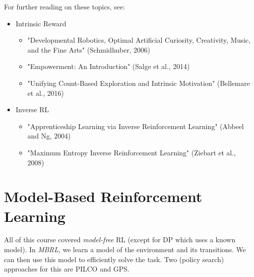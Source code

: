 		For further reading on these topics, see:
		\begin{itemize}
			\item Intrinsic Reward
				\begin{itemize}
					\item "Developmental Robotics, Optimal Artificial Curiosity, Creativity, Music, and the Fine Arts" (Schmidhuber, 2006)
					\item "Empowerment: An Introduction" (Salge et al., 2014)
					\item "Unifying Count-Based Exploration and Intrinsic Motivation" (Bellemare et al., 2016)
				\end{itemize}
			\item Inverse \ac{RL}
				\begin{itemize}
					\item "Apprenticeship Learning via Inverse Reinforcement Learning" (Abbeel and Ng, 2004)
					\item "Maximum Entropy Inverse Reinforcement Learning" (Ziebart et al., 2008)
				\end{itemize}
		\end{itemize}

	\section{Model-Based Reinforcement Learning}
		All of this course covered \emph{model-free} \ac{RL} (except for \ac{DP} which uses a known model). In \emph{\ac{MBRL}}, we learn a model of the environment and its transitions. We can then use this model to efficiently solve the task. Two (policy search) approaches for this are \ac{PILCO} and \ac{GPS}.

